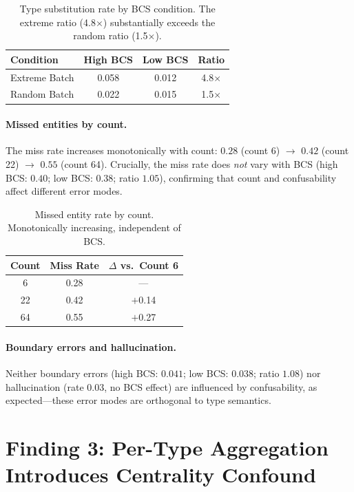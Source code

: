 \documentclass[11pt,a4paper]{article}
\begin{document}
\begin{table}[t]
\centering
\caption{Type substitution rate by BCS condition. The extreme ratio (4.8$\times$) substantially exceeds the random ratio (1.5$\times$).}
\label{tab:type_sub_bcs}
\small
\begin{tabular}{lccc}
\toprule
\textbf{Condition} & \textbf{High BCS} & \textbf{Low BCS} & \textbf{Ratio} \\
\midrule
Extreme Batch & 0.058 & 0.012 & 4.8$\times$ \\
Random Batch  & 0.022 & 0.015 & 1.5$\times$ \\
\bottomrule
\end{tabular}
\end{table}

\paragraph{Missed entities by count.}
The miss rate increases monotonically with count: $0.28$ (count 6) $\to$ $0.42$ (count 22) $\to$ $0.55$ (count 64).
Crucially, the miss rate does \emph{not} vary with BCS (high BCS: $0.40$; low BCS: $0.38$; ratio $1.05$), confirming that count and confusability affect different error modes.

\begin{table}[t]
\centering
\caption{Missed entity rate by count. Monotonically increasing, independent of BCS.}
\label{tab:miss_count}
\small
\begin{tabular}{ccc}
\toprule
\textbf{Count} & \textbf{Miss Rate} & \textbf{$\Delta$ vs.\ Count 6} \\
\midrule
6  & 0.28 & --- \\
22 & 0.42 & $+$0.14 \\
64 & 0.55 & $+$0.27 \\
\bottomrule
\end{tabular}
\end{table}

\paragraph{Boundary errors and hallucination.}
Neither boundary errors (high BCS: $0.041$; low BCS: $0.038$; ratio $1.08$) nor hallucination (rate $0.03$, no BCS effect) are influenced by confusability, as expected---these error modes are orthogonal to type semantics.


\section{Finding 3: Per-Type Aggregation Introduces Centrality Confound}
\label{sec:finding3}
\end{document}
